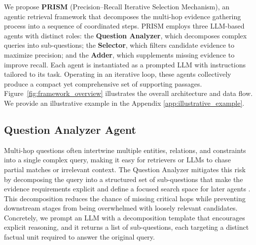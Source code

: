 \documentclass{article} %
\begin{document}
We propose \textbf{PRISM} (Precision–Recall Iterative Selection Mechanism), 
an agentic retrieval framework that decomposes the multi-hop evidence gathering process 
into a sequence of coordinated steps. PRISM employs three LLM-based agents with distinct roles: the \textbf{Question Analyzer}, which decomposes complex queries into sub-questions; the \textbf{Selector}, which filters candidate evidence to maximize precision; and the \textbf{Adder}, which supplements missing evidence to improve recall. 
Each agent is instantiated as a prompted LLM with instructions tailored to its task. Operating in an iterative loop, these agents collectively produce a compact yet comprehensive set of supporting passages. Figure~\ref{fig:framework_overview} illustrates the overall architecture and data flow. We provide an illustrative example in the Appendix \ref{app:illustrative_example}.

\subsection{Question Analyzer Agent}

Multi-hop questions often intertwine multiple entities, relations, and constraints into a single complex query, making it easy for retrievers or LLMs to chase partial matches or irrelevant context. The Question Analyzer mitigates this risk by decomposing the query into a structured set of sub-questions that make the evidence requirements explicit and define a focused search space for later agents \citep{fu-etal-2021-decomposing-complex}. This decomposition reduces the chance of missing critical hops while preventing downstream stages from being overwhelmed with loosely relevant candidates. Concretely, we prompt an LLM with a decomposition template that encourages explicit reasoning, and it returns a list of sub-questions, each targeting a distinct factual unit required to answer the original query.
\end{document}
